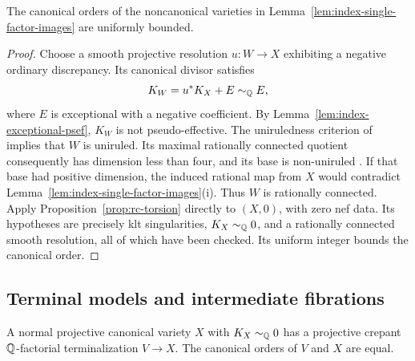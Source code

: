 \begin{corollary}\label{cor:index-noncanonical}
The canonical orders of the noncanonical varieties in
Lemma~\ref{lem:index-single-factor-images} are uniformly bounded.
\end{corollary}

\begin{proof}
Choose a smooth projective resolution \(u:W\to X\) exhibiting a
negative ordinary discrepancy.  Its canonical divisor satisfies
\[
                  K_W=u^*K_X+E\sim_{\mathbb Q}E,
\]
where \(E\) is exceptional with a negative coefficient.  By
Lemma~\ref{lem:index-exceptional-psef}, \(K_W\) is not pseudo-effective.
The uniruledness criterion of \cite{BDPP2013} implies that \(W\) is
uniruled.  Its maximal rationally connected quotient consequently has
dimension less than four, and its base is non-uniruled
\cite[Corollary~1.4]{GHS2003}.  If that base had positive dimension, the
induced rational map from \(X\) would contradict
Lemma~\ref{lem:index-single-factor-images}(i).  Thus \(W\) is rationally
connected.  Apply Proposition~\ref{prop:rc-torsion} directly to
\((X,0)\), with zero nef data.  Its hypotheses are precisely klt
singularities, \(K_X\sim_{\mathbb Q}0\), and a rationally connected smooth
resolution, all of which have been checked.  Its uniform integer
bounds the canonical order.
\end{proof}

\subsection{Terminal models and intermediate fibrations}

\begin{lemma}\label{lem:index-terminalization}
A normal projective canonical variety \(X\) with \(K_X\sim_{\mathbb Q}0\)
has a projective crepant \(\mathbb Q\)-factorial terminalization \(V\to X\).
The canonical orders of \(V\) and \(X\) are equal.
\end{lemma}

